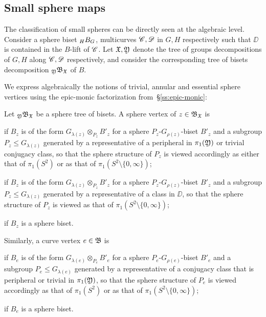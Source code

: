 \documentclass{amsart}
\begin{document}
\subsection{Small sphere maps}
The classification of small spheres can be directly seen at the
algebraic level. Consider a sphere biset $\subscript H B_G$,
multicurves ${\mathscr C},{\mathscr D}$ in $G,H$ respectively such that $\DD$ is
contained in the $B$-lift of ${\mathscr C}$.  Let ${\mathfrak X},{\mathfrak Y}$ denote the tree of
groups decompositions of $G,H$ along ${\mathscr C},{\mathscr D}$ respectively, and
consider the corresponding tree of bisets decomposition
$\subscript\gfY\gfB_\gf$ of $B$.

We express algebraically the notions of trivial, annular and essential
sphere vertices using the epic-monic factorization
from~\S\ref{ss:epic-monic}:
\begin{defn}
\label{defn:AlgSphClass}
  Let $\subscript\gfY\gfB_\gf$ be a sphere tree of bisets. A
  sphere vertex of $z\in{\mathfrak B}_{\mathfrak X}$ is
  \begin{idescription}
  \item[trivial] if $B_z$ is of the form
    $G_{\lambda(z)}\otimes_{P_z} B'_z$ for a sphere
    $P_z$-$G_{\rho(z)}$-biset $B'_z$ and a subgroup
    $P_z\le G_{\lambda(z)}$ generated by a
    representative of a peripheral in $\pi_1({\mathfrak Y})$ or trivial
    conjugacy class, so that the sphere structure of $P_z$ is viewed
    accordingly as either that of $\pi_1(S^2)$ or as that of
    $\pi_1(S^2\setminus \{0,\infty\})$;
  \item[annular] if $B_z$ is of the form
    $G_{\lambda(z)}\otimes_{P_z} B'_z$ for a sphere
    $P_z$-$G_{\rho(z)}$-biset $B'_z$ and a subgroup
    $P_z\le G_{\lambda(z)}$ generated by a
    representative of a class in $\DD$, so that the sphere structure
    of $P_z$ is viewed as that of $\pi_1(S^2\setminus \{0,\infty\})$;
  \item[essential] if $B_z$ is a sphere biset.
  \end{idescription}

  Similarly, a curve vertex $e\in {\mathfrak B}$ is
  \begin{idescription}
  \item[non-essential] if $B_e$ is of the form
    $G_{\lambda(e)}\otimes_{P_e} B'_e$ for a sphere
    $P_e$-$G_{\rho(e)}$-biset $B'_e$ and a subgroup $P_e\le
    G_{\lambda(e)}$ generated by a
    representative of a conjugacy class that is peripheral or trivial
    in $\pi_1({\mathfrak Y})$, so that the sphere structure of $P_e$ is
    viewed accordingly as that of $\pi_1(S^2)$ or as that of
    $\pi_1(S^2\setminus \{0,\infty\})$;
  \item[essential] if $B_e$ is a sphere biset.\qedhere
  \end{idescription}
\end{defn}
\end{document}
